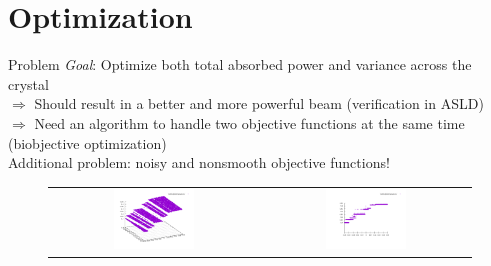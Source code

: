 \documentclass[aspectratio=43,t]{beamer}
\begin{document}
	\section{Optimization}

	\begin{frame}[fragile]{Problem}
		\emph{Goal}: Optimize both total absorbed power and variance across the crystal\\
		\bigskip
		$\Rightarrow$ Should result in a better and more powerful beam (verification in ASLD)\\
		\bigskip
		$\Rightarrow$ Need an algorithm to handle two objective functions at the same time (biobjective optimization)\\
		\bigskip
		Additional problem: noisy and nonsmooth objective functions!
	
	\begin{figure}
        \centering
        \begin{tabular}{c c}
        \includegraphics[width=0.4\textwidth]{images/discontinuity.pdf} &
        \includegraphics[width=0.4\textwidth]{images/noisyness.pdf}
        \end{tabular}
    \end{figure}

	\end{frame}
\end{document}
